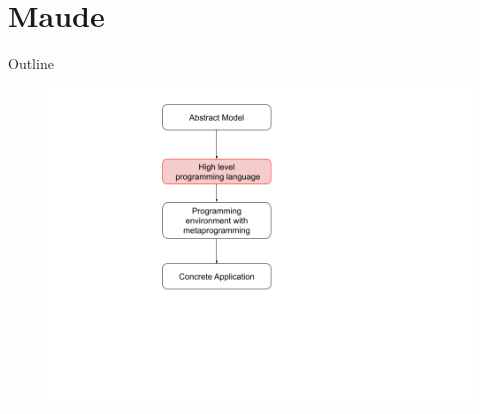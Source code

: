\documentclass{beamer}
\begin{document}
\section{Maude}
\begin{frame}{Outline}
    \begin{figure}
        \includegraphics[height=\textheight]{img/sec2.png}
    \end{figure}
\end{frame}
\end{document}
